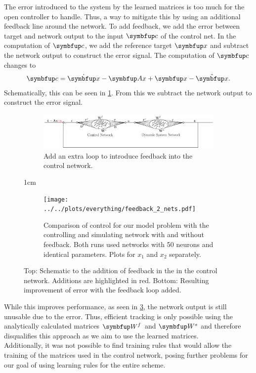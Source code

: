 The error introduced to the system by the learned matrices is too much for the open controller to handle. Thus, a way to mitigate this by using an additional feedback line around the network. To add feedback, we add the error between target and network output to the input $\bmu{c}$ of the control net. In the computation of $\bmu{c}$, we add the reference target $\bmu{x}$ and subtract the network output to construct the error signal. The computation of $\bmu{c}$ changes to
\begin{equation}
\bmu{c} = \dot{\bmu{x}} - \bmu{Ax} + \bmu{x} - \hat{\bmu{x}}.
\end{equation}
Schematically, this can be seen in \cref{fig:schematic_feedback_control_2_nets}. From this we subtract the network output to construct the error signal.
\begin{figure}
	\centering

	\begin{subfigure}{\textwidth}
		\centering
		\includegraphics[width=\textwidth]{svg-inkscape/schematic_controller_network_feedback_2_nets.pdf}
		\caption{Add an extra loop to introduce feedback into the control network.}
		\label{fig:schematic_feedback_control_2_nets}
	\end{subfigure}
	\vfill{1cm}
	\begin{subfigure}{\textwidth}
		\centering
		\texttt{[image: ../../plots/everything/feedback\_2\_nets.pdf]}
		\caption{Comparison of control for our model problem with the controlling and simulating network with and without feedback. Both runs used networks with 50 neurons and identical parameters. Plots for $x_1$ and $x_2$ separately.}
		\label{fig:feedback_control_2_nets_error}

	\end{subfigure}
	\caption{Top: Schematic to the addition of feedback in the in the control network. Additions are highlighted in red. Bottom: Resulting improvement of error with the feedback loop added.}
\end{figure}
While this improves performance, as seen in \cref{fig:feedback_control_2_nets_error}, the network output is still unusable due to the error. Thus, efficient tracking is only possible using the analytically calculated matrices $\bmu{W}^f$ and $\bmu{W}^s$ and therefore disqualifies this approach as we aim to use the learned matrices.\\ Additionally, it was not possible to find training rules that would allow the training of the matrices used in the control network, posing further problems for our goal of using learning rules for the entire scheme.

